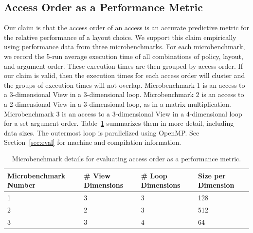 \documentclass[sigconf,review=true]{acmart}
\begin{document}
\subsection{Access Order as a Performance Metric}
\label{sec:AccessMetric}
Our claim is that the access order of an access is an accurate predictive metric for the relative performance of a layout choice. 
We support this claim empirically using performance data from three microbenchmarks.
For each microbenchmark, we record the 5-run average execution time of all combinations of policy, layout, and argument order. 
These execution times are then grouped by access order.
If our claim is valid, then the execution times for each access order will cluster and the groups of execution times will not overlap.
Microbenchmark 1 is an access to a 3-dimensional View in a 3-dimensional loop. 
Microbenchmark 2 is an access to a 2-dimensional View in a 3-dimensional loop, as in a matrix multiplication.
Microbenchmark 3 is an access to a 3-dimensional View in a 4-dimensional loop for a set argument order.
Table~\ref{MicrobenchmarkDetails} summarizes them in more detail, including data sizes.
The outermost loop is parallelized using OpenMP.
See Section~\ref{sec:eval} for machine and compilation information.

\begin{table}
	\centering
	\begin{tabular}{p{2.2cm}|p{1.6cm}|p{1.6cm}|p{1.5cm}}

		\raggedright Microbenchmark \linebreak Number & \raggedright \# View \linebreak Dimensions & \raggedright \# Loop \linebreak Dimensions & \raggedright Size per \linebreak Dimension \tabularnewline
		\hline
		1 & 3 & 3 & 128 \\
		2 & 2 & 3 & 512 \\
		3 & 3 & 4 & 64 
	\end{tabular}
	\caption{Microbenchmark details for evaluating access order as a performance metric.}
	\label{MicrobenchmarkDetails}
\end{table}
\end{document}
